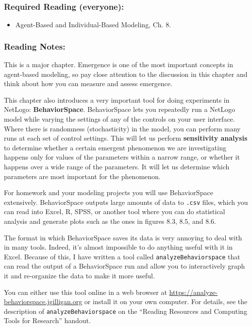 \documentclass[
]{article}
\providecommand{\tightlist}{%
  \setlength{\itemsep}{0pt}\setlength{\parskip}{0pt}}
\begin{document}
\subsubsection{Required Reading
(everyone):}\label{required-reading-everyone-7}

\begin{itemize}
\tightlist
\item
  Agent-Based and Individual-Based Modeling, Ch. 8.
\end{itemize}

\subsubsection{Reading Notes:}\label{reading-notes-7}

This is a major chapter. Emergence is one of the most important concepts
in agent-based modeling, so pay close attention to the discussion in
this chapter and think about how you can measure and assess emergence.

This chapter also introduces a very important tool for doing experiments
in NetLogo: \textbf{BehaviorSpace}. BehaviorSpace lets you repeatedly
run a NetLogo model while varying the settings of any of the controls on
your user interface. Where there is randomness (stochasticity) in the
model, you can perform many runs at each set of control settings. This
will let us perform \textbf{sensitivity analysis} to determine whether a
certain emergent phenomenon we are investigating happens only for values
of the parameters within a narrow range, or whether it happens over a
wide range of the parameters. It will let us determine which parameters
are most important for the phenomenon.

For homework and your modeling projects you will use BehaviorSpace
extensively. BehaviorSpace outputs large amounts of data to
\texttt{.csv} files, which you can read into Excel, R, SPSS, or another
tool where you can do statistical analysis and generate plots such as
the ones in figures 8.3, 8.5, and 8.6.

The format in which BehaviorSpace saves its data is very annoying to
deal with in many tools. Indeed, it's almost impossible to do anything
useful with it in Excel. Because of this, I have written a tool called
\texttt{analyzeBehaviorspace} that can read the output of a
BehaviorSpace run and allow you to interactively graph it and
re-organize the data to make it more useful.

You can either use this tool online in a web browser at
\url{https://analyze-behaviorspace.jgilligan.org} or install it on your
own computer. For details, see the description of
\texttt{analyzeBehaviorspace} on the ``Reading Resources and Computing
Tools for Research'' handout.
\end{document}
